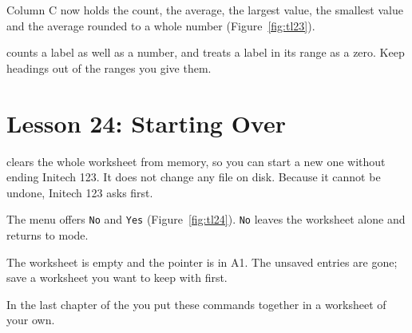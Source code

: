 \begin{Keystrokes}
\end{Keystrokes}
Column C now holds the count, the average, the largest value, the smallest
value and the average rounded to a whole number
(Figure~\ref{fig:tl23}).
\begin{Caution}
 counts a label as well as a number, and  treats a
label in its range as a zero.  Keep headings out of the ranges you give
them.
\end{Caution}

\section{Lesson 24: Starting Over}
 clears the whole worksheet from memory, so you
can start a new one without ending Initech 123.  It does not change any
file on disk.  Because it cannot be undone, Initech 123 asks first.

\begin{Keystrokes}
\end{Keystrokes}
The menu offers \texttt{No} and \texttt{Yes}
(Figure~\ref{fig:tl24}).  \texttt{No} leaves the worksheet alone and returns
to  mode.
\begin{Keystrokes}
\end{Keystrokes}
The worksheet is empty and the pointer is in A1.  The unsaved entries are
gone; save a worksheet you want to keep with  first.

In the last chapter of the  you put these commands
together in a worksheet of your own.
